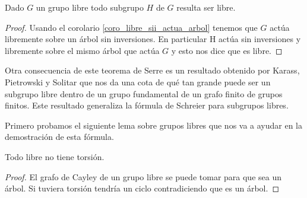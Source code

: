 \documentclass[tesis.tex]{subfiles}
\begin{document}
\begin{coro}\label{coro_niels_sch}
	Dado $G$ un grupo libre todo subgrupo $H$ de $G$ resulta ser libre.
\end{coro}
\begin{proof} 
	Usando el corolario \ref{coro_libre_sii_actua_arbol} tenemos que $G$ actúa libremente sobre un árbol sin inversiones.
	En particular H actúa sin inversiones y libremente sobre el mismo árbol que actúa $G$ y esto nos dice que es libre.
\end{proof}

Otra consecuencia de este teorema de Serre es un resultado obtenido por Karass, Pietrowski y Solitar que nos da una cota de qué tan grande puede ser un subgrupo libre dentro de un grupo fundamental de un grafo finito de grupos finitos.
Este resultado generaliza la fórmula de Schreier para subgrupos libres.


Primero probamos el siguiente lema sobre grupos libres que nos va a ayudar en la demostración de esta fórmula.

\begin{lema}\label{lema_libre_torsion}
	Todo \fg libre no tiene torsión.
\end{lema}
\begin{proof}
	El grafo de Cayley de un grupo libre se puede tomar para que sea un árbol.
	Si tuviera torsión tendría un ciclo contradiciendo que es un árbol.
\end{proof}
\end{document}

